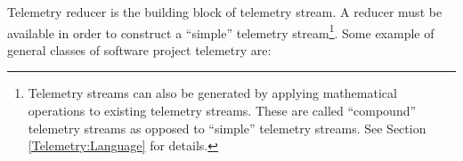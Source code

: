 Telemetry reducer is the building block of telemetry stream. A reducer must be available in order to construct a ``simple'' telemetry stream\footnote{Telemetry streams can also be generated by applying mathematical operations to existing telemetry streams. These are called ``compound'' telemetry streams as opposed to ``simple'' telemetry streams. See Section \ref{Telemetry:Language} for details.}. Some example of general classes of software project telemetry are:








